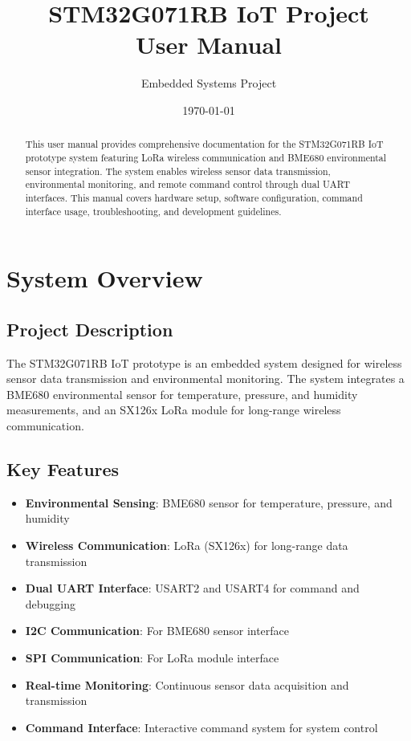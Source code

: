 \documentclass[11pt,a4paper]{article}
\title{\Huge\textbf{STM32G071RB IoT Project\\User Manual}}
\author{Embedded Systems Project}
\date{\today}
\begin{document}
\maketitle

\begin{abstract}
This user manual provides comprehensive documentation for the STM32G071RB IoT prototype system featuring LoRa wireless communication and BME680 environmental sensor integration. The system enables wireless sensor data transmission, environmental monitoring, and remote command control through dual UART interfaces. This manual covers hardware setup, software configuration, command interface usage, troubleshooting, and development guidelines.
\end{abstract}

\tableofcontents
\newpage

\section{System Overview}

\subsection{Project Description}
The STM32G071RB IoT prototype is an embedded system designed for wireless sensor data transmission and environmental monitoring. The system integrates a BME680 environmental sensor for temperature, pressure, and humidity measurements, and an SX126x LoRa module for long-range wireless communication.

\subsection{Key Features}
\begin{itemize}
    \item \textbf{Environmental Sensing}: BME680 sensor for temperature, pressure, and humidity
    \item \textbf{Wireless Communication}: LoRa (SX126x) for long-range data transmission
    \item \textbf{Dual UART Interface}: USART2 and USART4 for command and debugging
    \item \textbf{I2C Communication}: For BME680 sensor interface
    \item \textbf{SPI Communication}: For LoRa module interface
    \item \textbf{Real-time Monitoring}: Continuous sensor data acquisition and transmission
    \item \textbf{Command Interface}: Interactive command system for system control
\end{itemize}
\end{document}
